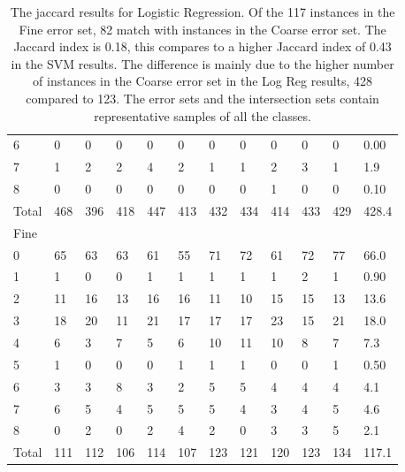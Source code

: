 \documentclass[ms]{nuthesis}
\begin{document}
\begin{table}[h]
\begin{tabular}{|l||l||l||l||l||l||l||l||l||l||l||l|}
    6 & 0 & 0 & 0 & 0 & 0 & 0 & 0 & 0 & 0 & 0 & 0.00 \\
    7 & 1 & 2 & 2 & 4 & 2 & 1 & 1 & 2 & 3 & 1 & 1.9 \\
    8 & 0 & 0 & 0 & 0 & 0 & 0 & 0 & 1 & 0 & 0 & 0.10 \\
    Total & 468 & 396 & 418 & 447 & 413 & 432 & 434 & 414 & 433 & 429 & 428.4 \\
    Fine &  &  &  &  &  &  &  &  &  &  &  \\
    0 & 65 & 63 & 63 & 61 & 55 & 71 & 72 & 61 & 72 & 77 & 66.0 \\
    1 & 1 & 0 & 0 & 1 & 1 & 1 & 1 & 1 & 2 & 1 & 0.90 \\
    2 & 11 & 16 & 13 & 16 & 16 & 11 & 10 & 15 & 15 & 13 & 13.6 \\
    3 & 18 & 20 & 11 & 21 & 17 & 17 & 17 & 23 & 15 & 21 & 18.0 \\
    4 & 6 & 3 & 7 & 5 & 6 & 10 & 11 & 10 & 8 & 7 & 7.3 \\
    5 & 1 & 0 & 0 & 0 & 1 & 1 & 1 & 0 & 0 & 1 & 0.50 \\
    6 & 3 & 3 & 8 & 3 & 2 & 5 & 5 & 4 & 4 & 4 & 4.1 \\
    7 & 6 & 5 & 4 & 5 & 5 & 5 & 4 & 3 & 4 & 5 & 4.6 \\
    8 & 0 & 2 & 0 & 2 & 4 & 2 & 0 & 3 & 3 & 5 & 2.1 \\
    Total & 111 & 112 & 106 & 114 & 107 & 123 & 121 & 120 & 123 & 134 & 117.1 \\ \bottomrule
  \end{tabular}
  \caption{The jaccard results for Logistic Regression. Of the 117 instances in the
  Fine error set, 82 match with instances in the Coarse error set. The Jaccard index is 0.18,
  this compares to a higher Jaccard index of 0.43 in the SVM results. The difference is mainly
  due to the higher number of instances in the Coarse error set in the Log Reg results, 428 compared
  to 123. The error sets and the intersection sets contain representative samples of all the classes.}
  \label{tab:SVM}
\end{table}
\FloatBarrier
\end{document}
